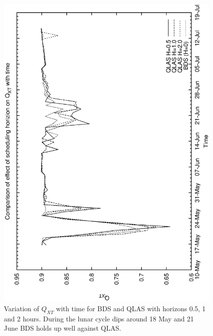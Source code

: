 \begin{figure}[htp]
\begin{center}
  \includegraphics[scale=0.5, angle=-90]{figures/qsa3_xt.eps}
  \caption[Variation of $Q_{XT}$ with time for QLAS horizons.]
  {Variation of $Q_{XT}$ with time for BDS and QLAS with horizons 0.5, 1 and 2 hours. During the lunar cycle dips around 18 May and 21 June BDS holds up well against QLAS.}
\label{fig:ensemble_qlas_xt}
\end{center}
\end{figure}

